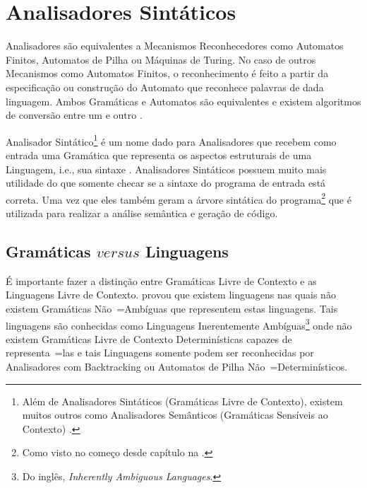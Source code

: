 {\section{Analisadores Sintáticos}
\label{analisadoresSintaticos}

    Analisadores são equivalentes a Mecanismos Reconhecedores como Automatos Finitos,
    Automatos de Pilha ou
    Máquinas de Turing.
    No caso de outros Mecanismos como Automatos Finitos,
    o reconhecimento é feito a partir da especificação ou
    construção do Automato que reconhece palavras de dada linguagem.
    Ambos Gramáticas e
    Automatos são equivalentes e
    existem algoritmos de conversão entre um e
    outro \cite{hopcroftBook}.

    Analisador Sintático\footnote{
    Além de Analisadores Sintáticos (Gramáticas Livre de Contexto),
    existem muitos outros como Analisadores Semânticos (Gramáticas Sensíveis ao Contexto) \cite{contextSensitiveParsing}.
    }
    é um nome dado para Analisadores que recebem como entrada uma Gramática que representa os aspectos estruturais de uma Linguagem,
    i.e.,
    sua sintaxe \cite{ahoCompilerDragonBook}.
    Analisadores Sintáticos possuem muito mais utilidade do que somente checar se a sintaxe do programa de entrada está correta.
    Uma vez que eles também geram a árvore sintática do programa\footnote{
    Como visto no começo desde capítulo na .
    }
    que é utilizada para realizar a análise semântica e
    geração de código.


\subsection{Gramáticas $versus$ Linguagens}
\label{gramaticasVersusLinguagens}

    É importante fazer a distinção entre Gramáticas Livre de Contexto e
    as Linguagens Livre de Contexto.
     provou que existem linguagens nas quais não existem Gramáticas Não~=Ambíguas que representem estas linguagens.
    Tais linguagens são conhecidas como Linguagens Inerentemente Ambíguas\footnote{
    Do inglês,
    \textit{Inherently Ambiguous Languages}.
    }
    onde não existem Gramáticas Livre de Contexto Determinísticas capazes de representa~=las e
    tais Linguagens somente podem ser reconhecidas por Analisadores com Backtracking \cite{ahoCompilerDragonBook} ou
    Automatos de Pilha Não~=Determinísticos.

}
